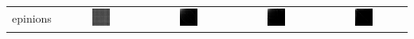 \documentclass{article}
\begin{document}
\begin{table}[h]
\begin{tabular}{l | c c c c}
\hline
epinions
&
    \includegraphics[width=0.23\textwidth]{../img/epinions/adjacency-matrix-random-ordering.png}
& 
    \includegraphics[width=0.23\textwidth]{../img/epinions/adjacency-matrix-given-ordering.png}
& 
    \includegraphics[width=0.23\textwidth]{../img/epinions/adjacency-matrix-degree-ordering.png}
& 
    \includegraphics[width=0.23\textwidth]{../img/epinions/adjacency-matrix-slashburn-ordering.png} \\


\end{tabular}
\end{table}
\end{document}
